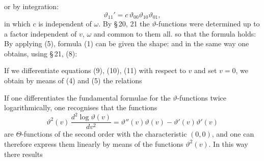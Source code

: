 or by integration:
\[
\vartheta_{11}' = c\,\vartheta_{00}\vartheta_{10}\vartheta_{01},
\]
in which $c$ is independent of $\omega$. By \S\,20, 21 the $\vartheta$-functions were determined up to a factor independent of $v$, $\omega$ and common to them all.  so that the formula holds:
 By applying (5), formula (1) can be given the shape:
and in the same way one obtains, using \S\,21, (8):

If we differentiate equations (9), (10), (11) with respect to $v$ and set $v=0$, we obtain by means of (4) and (5) the relations

If one differentiates the fundamental formulae %
for the $\vartheta$-functions twice logarithmically, one recognises that the functions
\[
\vartheta^2(v)\,\frac{d^2\log\vartheta(v)}{dv^2} = \vartheta''(v)\vartheta(v) - \vartheta'(v)\vartheta'(v)
\]
are $\Theta$-functions of the second order with the characteristic $(0,0)$, and one can therefore express them linearly by means of the functions $\vartheta^2(v)$. In this way there results
